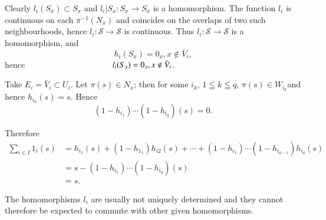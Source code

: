  Clearly $l_i (S_x) \subset S_x$ and $l_i | S_x : S_x \to S_x$ is a
 homomorphism. The function $l_i$ is continuous on each $\pi^{-1}
 (N_x)$ and coincides on the overlaps of two such neighbourhoods, hence
 $l_i : \mathscr{S} \to \mathscr{S}$ is continuous. Thus $l_i :
 \mathscr{S} \to \mathscr{S}$ is a homomorphism, and    
$$
 h_i (S_x)  = 0_x,  x \notin \bar{V}_i,
$$
hence $\hspace{3.6cm} l_i (S_x)  = 0_x,  x \notin \bar{V}_i$. 
  
 Take $E_i = \bar{V}_i \subset U_i$. Let $\pi (s) \in N_x $;
 then for some $i_k$, $1 \leqq k \leqq q$, $\pi (s) \in
 W_{i{_k}}$\pageoriginale and  hence $h_{i{_k}} (s) = s$. Hence  
 $$
 (1 -h_{i{_1}}) \cdots (1 -h_{i_{q}}) (s) = 0.
 $$
 
 Therefore
 \begin{align*}
\sum_{i \in I} 1_i (s) & = h_{i{_1}} (s) + (1 -h_{1{_1}})
h_{i{2}} (s) +\cdots+ (1-h_{i{_1}}) \cdots (1-h_{i{_{q-1}}}) h_{i_{q}}
(s) \\ 
& = s - (1-h_{i{_1}}) \cdots (1-h_{i{_q}}) (s)\\ 
& =s.
 \end{align*} 
 
 \begin{note*}%
The homomorphisms $l_i$ are usually not uniquely determined and they
cannot therefore be expected to commute with other given
homomorphisms. 
 \end{note*}

